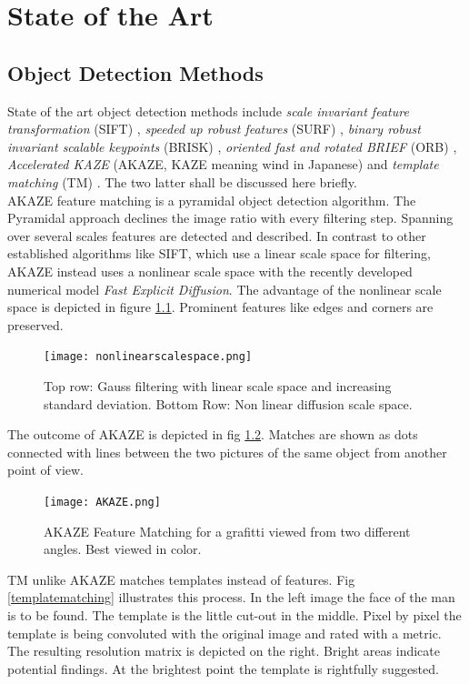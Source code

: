 \chapter{State of the Art\label{cha:chapter2}}
\section{Object Detection Methods}
State of the art object detection methods include \textit{scale invariant feature transformation} (SIFT) \cite{Lowe2004DistinctiveKeypoints}, \textit{speeded up robust features} (SURF) \cite{Bay2008Speeded-UpSURF}, \textit{binary robust invariant scalable
keypoints} (BRISK) \cite{Leutenegger2011BRISK:Keypoints}, \textit{oriented fast and rotated BRIEF} (ORB) \cite{Rublee2011ORB:SURF}, \textit{Accelerated KAZE} (AKAZE, KAZE meaning wind in Japanese) \cite{Alcantarilla2012KAZEFeatures, Alcantarilla2013FastSpaces} and \textit{template matching} (TM) \cite{Brunelli2009TemplatePractice}. The two latter shall be discussed here briefly.\\

AKAZE feature matching is a pyramidal object detection algorithm. The Pyramidal approach declines the image ratio with every filtering step. Spanning over several scales features are detected and described. In contrast to other established algorithms like SIFT, which use a linear scale space for filtering, AKAZE instead uses a nonlinear scale space with the recently developed numerical model \textit{Fast Explicit Diffusion}. The advantage of the nonlinear scale space is depicted in figure  \ref{skalenraum}. Prominent features like edges and corners are preserved. 
\begin{figure}[ht]
	\centering
  \texttt{[image: nonlinearscalespace.png]}
	\caption{Top row: Gauss filtering with linear scale space and increasing standard deviation. Bottom Row: Non linear diffusion scale space. \cite{Alcantarilla2012KAZEFeatures}}
	\label{skalenraum}
\end{figure}
The outcome of AKAZE is depicted in fig \ref{AKAZE}. Matches are shown as dots connected with lines between the two pictures of the same object from another point of view.
\begin{figure}[ht]
	\centering
  \texttt{[image: AKAZE.png]}
	\caption{AKAZE Feature Matching for a grafitti viewed from two different angles. Best viewed in color. \cite{Documentation.LastVisited2018-11-15.TutorialMatching}}
	\label{AKAZE}
\end{figure}
 \newline
TM unlike AKAZE matches templates instead of features. Fig \ref{templatematching} illustrates this process. In the left image the face of the man is to be found. The template is the little cut-out in the middle. Pixel by pixel the template is being convoluted with the original image and rated with a metric. The resulting resolution matrix is depicted on the right. Bright areas indicate potential findings. At the brightest point the template is rightfully suggested.

